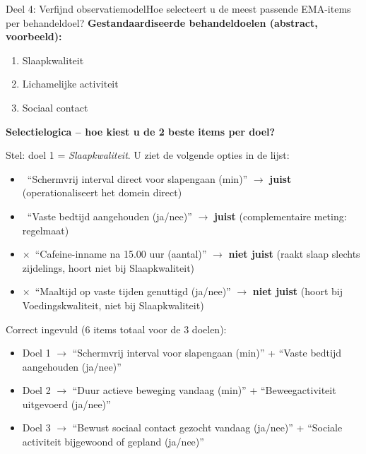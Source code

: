 \documentclass[11pt,a4paper]{article}
\begin{document}
\begin{voorbeeldbox}{Deel 4: Verfijnd observatiemodel}{Hoe selecteert u de meest passende EMA-items per behandeldoel?}
\small
\textbf{Gestandaardiseerde behandeldoelen (abstract, voorbeeld):}
\begin{enumerate}[topsep=2pt,itemsep=1pt,label=\arabic*.]
\item Slaapkwaliteit
\item Lichamelijke activiteit
\item Sociaal contact
\end{enumerate}

\textbf{Selectielogica -- hoe kiest u de 2 beste items per doel?}

Stel: doel 1 = \textit{Slaapkwaliteit}. U ziet de volgende opties in de lijst:
\begin{itemize}[topsep=2pt,itemsep=1pt]
\item \checkmark\ ``Schermvrij interval direct voor slapengaan (min)'' $\rightarrow$ \textbf{juist} (operationaliseert het domein direct)
\item \checkmark\ ``Vaste bedtijd aangehouden (ja/nee)'' $\rightarrow$ \textbf{juist} (complementaire meting: regelmaat)
\item $\times$\ ``Cafeine-inname na 15.00 uur (aantal)'' $\rightarrow$ \textbf{niet juist} (raakt slaap slechts zijdelings, hoort niet bij Slaapkwaliteit)
\item $\times$\ ``Maaltijd op vaste tijden genuttigd (ja/nee)'' $\rightarrow$ \textbf{niet juist} (hoort bij Voedingskwaliteit, niet bij Slaapkwaliteit)
\end{itemize}

\medskip
Correct ingevuld (6 items totaal voor de 3 doelen):
\begin{itemize}[topsep=1pt,itemsep=0pt]
\item Doel 1 $\rightarrow$ ``Schermvrij interval voor slapengaan (min)'' + ``Vaste bedtijd aangehouden (ja/nee)''
\item Doel 2 $\rightarrow$ ``Duur actieve beweging vandaag (min)'' + ``Beweegactiviteit uitgevoerd (ja/nee)''
\item Doel 3 $\rightarrow$ ``Bewust sociaal contact gezocht vandaag (ja/nee)'' + ``Sociale activiteit bijgewoond of gepland (ja/nee)''
\end{itemize}
\end{voorbeeldbox}

\vspace{0.5em}
\end{document}
